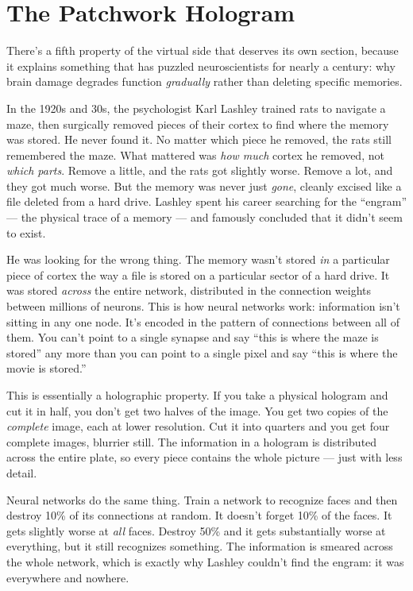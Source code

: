 \documentclass[11pt, twoside, openright]{book}
\begin{document}
\section*{The Patchwork Hologram}

There's a fifth property of the virtual side that deserves its own section, because it explains something that has puzzled neuroscientists for nearly a century: why brain damage degrades function \textit{gradually} rather than deleting specific memories.

In the 1920s and 30s, the psychologist Karl Lashley trained rats to navigate a maze, then surgically removed pieces of their cortex to find where the memory was stored. He never found it. No matter which piece he removed, the rats still remembered the maze. What mattered was \textit{how much} cortex he removed, not \textit{which parts}. Remove a little, and the rats got slightly worse. Remove a lot, and they got much worse. But the memory was never just \textit{gone}, cleanly excised like a file deleted from a hard drive. Lashley spent his career searching for the ``engram'' --- the physical trace of a memory --- and famously concluded that it didn't seem to exist.

He was looking for the wrong thing. The memory wasn't stored \textit{in} a particular piece of cortex the way a file is stored on a particular sector of a hard drive. It was stored \textit{across} the entire network, distributed in the connection weights between millions of neurons. This is how neural networks work: information isn't sitting in any one node. It's encoded in the pattern of connections between all of them. You can't point to a single synapse and say ``this is where the maze is stored'' any more than you can point to a single pixel and say ``this is where the movie is stored.''

This is essentially a holographic property. If you take a physical hologram and cut it in half, you don't get two halves of the image. You get two copies of the \textit{complete} image, each at lower resolution. Cut it into quarters and you get four complete images, blurrier still. The information in a hologram is distributed across the entire plate, so every piece contains the whole picture --- just with less detail.

Neural networks do the same thing. Train a network to recognize faces and then destroy 10\% of its connections at random. It doesn't forget 10\% of the faces. It gets slightly worse at \textit{all} faces. Destroy 50\% and it gets substantially worse at everything, but it still recognizes something. The information is smeared across the whole network, which is exactly why Lashley couldn't find the engram: it was everywhere and nowhere.
\end{document}
